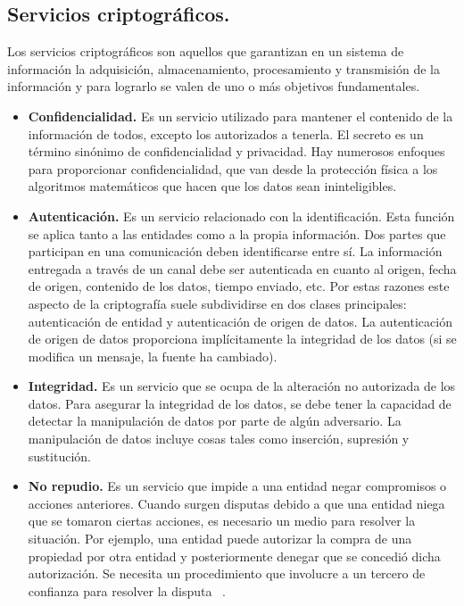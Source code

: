 \subsection{Servicios criptográficos. }
Los servicios criptográficos son aquellos que garantizan en un sistema de información la adquisición, almacenamiento, procesamiento y transmisión de la información y para lograrlo se valen de uno o más objetivos fundamentales. 
 \begin{itemize}
	\item \textbf{Confidencialidad. }
Es un servicio utilizado para mantener el contenido de la información de todos, excepto los autorizados a tenerla. El secreto es un término sinónimo de confidencialidad y privacidad.
Hay numerosos enfoques para proporcionar confidencialidad, que van desde la protección física a los algoritmos matemáticos que hacen que los datos sean ininteligibles.

	\item \textbf{Autenticación. }
Es un servicio relacionado con la identificación. Esta función se aplica tanto a las entidades como a la propia información. Dos partes que participan en una comunicación deben identificarse entre sí. La información entregada a través de un canal debe ser autenticada en cuanto al origen, fecha de origen, contenido de los datos, tiempo enviado, etc. Por estas razones este aspecto de la criptografía suele subdividirse en dos clases principales: autenticación de entidad y autenticación de origen de datos. La autenticación de origen de datos proporciona implícitamente la integridad de los datos (si se modifica un mensaje, la fuente ha cambiado).

	\item \textbf{Integridad. }
Es un servicio que se ocupa de la alteración no autorizada de los datos. Para asegurar la integridad de los datos, se debe tener la capacidad de detectar la manipulación de datos por parte de algún adversario. La manipulación de datos incluye cosas tales como inserción, supresión y sustitución.  

	\item \textbf{No repudio. }
Es un servicio que impide a una entidad negar compromisos o acciones anteriores. Cuando surgen disputas debido a que una entidad niega que se tomaron ciertas acciones, es necesario un medio para resolver la situación. Por ejemplo, una entidad puede autorizar la compra de una propiedad por otra entidad y posteriormente denegar que se concedió dicha autorización. Se necesita un procedimiento que involucre a un tercero de confianza para resolver la disputa  ~\cite{menezes}.
 \end{itemize}

